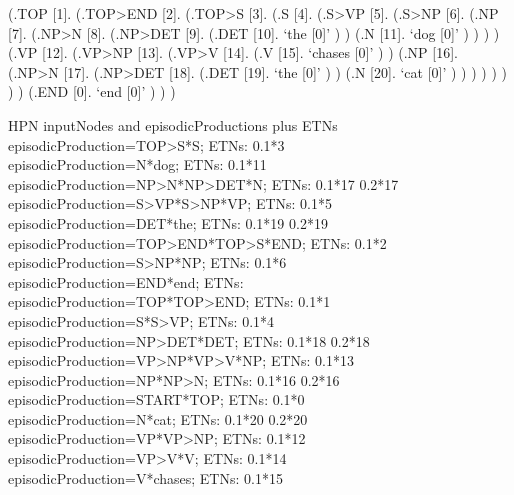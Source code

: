 \documentclass[10pt]{article}
\begin{document}
\begin{parsetree}  (.TOP [1]. (.TOP>END [2]. (.TOP>S [3]. (.S [4]. (.S>VP [5]. (.S>NP [6]. (.NP [7]. (.NP>N [8]. (.NP>DET [9]. (.DET [10]. `the [0]' ) ) (.N [11]. `dog [0]' ) ) ) ) (.VP [12]. (.VP>NP [13]. (.VP>V [14]. (.V [15]. `chases [0]' ) ) (.NP [16]. (.NP>N [17]. (.NP>DET [18]. (.DET [19]. `the [0]' ) ) (.N [20]. `cat [0]' ) ) ) ) ) ) ) ) (.END [0]. `end [0]' ) ) ) \end{parsetree}


HPN inputNodes and episodicProductions plus ETNs \\
episodicProduction=TOP>S*S; ETNs: 0.1*3 \\
episodicProduction=N*dog; ETNs: 0.1*11 \\
episodicProduction=NP>N*NP>DET*N; ETNs: 0.1*17 0.2*17 \\
episodicProduction=S>VP*S>NP*VP; ETNs: 0.1*5 \\
episodicProduction=DET*the; ETNs: 0.1*19 0.2*19 \\
episodicProduction=TOP>END*TOP>S*END; ETNs: 0.1*2 \\
episodicProduction=S>NP*NP; ETNs: 0.1*6 \\
episodicProduction=END*end; ETNs: \\
episodicProduction=TOP*TOP>END; ETNs: 0.1*1 \\
episodicProduction=S*S>VP; ETNs: 0.1*4 \\
episodicProduction=NP>DET*DET; ETNs: 0.1*18 0.2*18 \\
episodicProduction=VP>NP*VP>V*NP; ETNs: 0.1*13 \\
episodicProduction=NP*NP>N; ETNs: 0.1*16 0.2*16 \\
episodicProduction=START*TOP; ETNs: 0.1*0 \\
episodicProduction=N*cat; ETNs: 0.1*20 0.2*20 \\
episodicProduction=VP*VP>NP; ETNs: 0.1*12 \\
episodicProduction=VP>V*V; ETNs: 0.1*14 \\
episodicProduction=V*chases; ETNs: 0.1*15 \\
\end{document}
